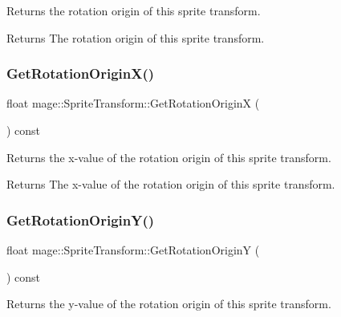 Returns the rotation origin of this sprite transform.

\begin{DoxyReturn}{Returns}
The rotation origin of this sprite transform. 
\end{DoxyReturn}
\hypertarget{structmage_1_1_sprite_transform_ac38e5a279f2e7fc7fe27cdadd5454dc6}{}\label{structmage_1_1_sprite_transform_ac38e5a279f2e7fc7fe27cdadd5454dc6} 
\subsubsection{\texorpdfstring{Get\+Rotation\+Origin\+X()}{GetRotationOriginX()}}
{\footnotesize\ttfamily float mage\+::\+Sprite\+Transform\+::\+Get\+Rotation\+OriginX (\begin{DoxyParamCaption}{ }\end{DoxyParamCaption}) const\hspace{0.3cm}{\ttfamily [noexcept]}}

Returns the x-\/value of the rotation origin of this sprite transform.

\begin{DoxyReturn}{Returns}
The x-\/value of the rotation origin of this sprite transform. 
\end{DoxyReturn}
\hypertarget{structmage_1_1_sprite_transform_aacc0ac5e8d0ffd2206a28513a1532977}{}\label{structmage_1_1_sprite_transform_aacc0ac5e8d0ffd2206a28513a1532977} 
\subsubsection{\texorpdfstring{Get\+Rotation\+Origin\+Y()}{GetRotationOriginY()}}
{\footnotesize\ttfamily float mage\+::\+Sprite\+Transform\+::\+Get\+Rotation\+OriginY (\begin{DoxyParamCaption}{ }\end{DoxyParamCaption}) const\hspace{0.3cm}{\ttfamily [noexcept]}}

Returns the y-\/value of the rotation origin of this sprite transform.

